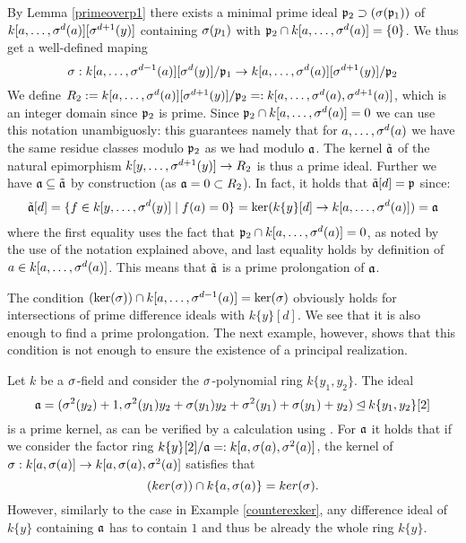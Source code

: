 \begin{prop}
\begin{bew}
By Lemma \ref{primeoverp1} there exists a minimal prime ideal $\mathfrak{p}_2 \supset (\sigma(\mathfrak{p}_1))$ of $k[a,\ldots,\sigma^d(a)][\sigma^{d+1}(y)]$ containing $\sigma(p_1)$ with $\mathfrak{p}_2 \cap k[a,\ldots,\sigma^d(a)] = \{0\}$. 
We thus get a well-defined maping
\[ \sigma: k[a,\ldots,\sigma^{d-1}(a)][\sigma^d(y)]/\mathfrak{p}_1 \rightarrow k[a,\ldots, \sigma^d(a)][\sigma^{d+1}(y)]/\mathfrak{p}_2 \]
We define $R_2:= k[a,\ldots,\sigma^d(a)][\sigma^{d+1}(y)]/\mathfrak{p}_2 =: k[a,\ldots,\sigma^d(a),\sigma^{d+1}(a)]$, which is an integer domain since $\mathfrak{p}_2$ is prime. Since $\mathfrak{p}_2 \cap k[a,\ldots,\sigma^d(a)] = 0$ we can use this notation unambiguosly:
this guarantees namely that for $a, \ldots, \sigma^d(a)$ we have the same residue classes modulo $\mathfrak{p}_2$ as we had modulo $\mathfrak{a}$.
The kernel $\tilde {\mathfrak{a}}$ of the natural epimorphism $k[y,\ldots,\sigma^{d+1}(y)] \rightarrow R_2$ is thus a prime ideal.
Further we have $\mathfrak{a} \subseteq \tilde {\mathfrak{a}}$ by construction (as $\mathfrak{a} = 0 \subset R_2$). In fact, it holds that $\tilde {\mathfrak{a}}[d] = \mathfrak{p}$ since: 
\begin{align*}
\tilde {\mathfrak{a}}[d] = \{ f \in k[y,\ldots,\sigma^d(y)] \mid f(a) = 0 \} = \ker( k\{y\}[d] \rightarrow k[a,\ldots,\sigma^{d}(a)]) = \mathfrak{a}
\end{align*}
where the first equality uses the fact that $\mathfrak{p}_2 \cap k[a,\ldots,\sigma^d(a)] = 0$, as noted by the use of the notation explained above, and last equality holds by definition of $a \in k[a,\ldots,\sigma^d(a)]$. This means that $\tilde {\mathfrak{a}}$ is a prime prolongation of $\mathfrak{a}$. 
\end{bew}
\end{prop}

The condition $(\operatorname{ker}(\sigma)) \cap k[a,\ldots,\sigma^{d-1}(a)] = \operatorname{ker}(\sigma)$ obviously holds for intersections of prime difference ideals with $k\{y\}[d]$. 
We see that it is also enough to find a prime prolongation. The next example, however, shows that this condition is not enough to ensure the existence of a principal realization.


\begin{ex}
Let $k$ be a $\sigma$-field and consider the $\sigma$-polynomial ring $k\{y_1,y_2\}$. 
The ideal $$\mathfrak{a} = (\sigma^2(y_2)+1,\sigma^2(y_1)y_2 + \sigma(y_1)y_2 + \sigma^2(y_1) + \sigma(y_1) + y_2) \unlhd k\{y_1,y_2\}[2]$$ is a prime kernel,
as can be verified by a calculation using \cite{M2}. For $\mathfrak{a}$ it holds that if we consider the factor ring 
$k\{y\}[2]/\mathfrak{a} =: k[a,\sigma(a),\sigma^2(a)]$, the kernel of $\sigma: k[a,\sigma(a)] \rightarrow k[a,\sigma(a),\sigma^2(a)]$
satisfies that $$(ker(\sigma)) \cap k\{a,\sigma(a)\} = ker(\sigma).$$ However, similarly to the case in Example \ref{counterexker}, any difference ideal of $k\{y\}$ containing 
$\mathfrak{a}$ has to contain $1$ and thus be already the whole ring $k\{y\}$.
\end{ex}

